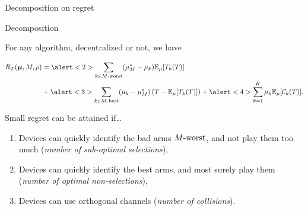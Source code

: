 \documentclass[12pt,english,ignorenonframetext,]{beamer}
\providecommand{\tightlist}{%
  \setlength{\itemsep}{0pt}\setlength{\parskip}{0pt}}
\begin{document}
\begin{frame}{Decomposition on regret}

\begin{block}{Decomposition}

For any algorithm, decentralized or not, we have \vspace*{-20pt}

\begin{small}\begin{align*}
R_T(\boldsymbol{\mu}, M, \rho) &= \alert<2>{\sum_{k \in \Mworst} (\mu_M^* -  \mu_k) \E_{\mu}[T_k(T)]} \\
&+ \alert<3>{\sum_{k \in \Mbest} (\mu_k -  \mu_M^*) \left(T - \E_{\mu}[T_k(T)]\right)} + \alert<4>{\sum_{k=1}^{K} \mu_k \E_{\mu}[\mathcal{C}_k(T)]}.
\end{align*}\end{small}

\vspace*{-10pt}

\end{block}

\begin{block}{Small regret can be attained if\ldots{}}

\pause

\begin{enumerate}
\def\labelenumi{\arabic{enumi}.}
\tightlist
\item
  Devices can quickly identify the bad arms \(M\text{-}\mathrm{worst}\), and not play
  them too much
  (\alert<2>{\emph{number of sub-optimal selections}}),\pause
\item
  Devices can quickly identify the best arms, and most surely play them
  (\alert<3>{\emph{number of optimal non-selections}}),\pause
\item
  Devices can use orthogonal channels
  (\alert<4>{\emph{number of collisions}}).
\end{enumerate}

\end{block}

\end{frame}
\end{document}
